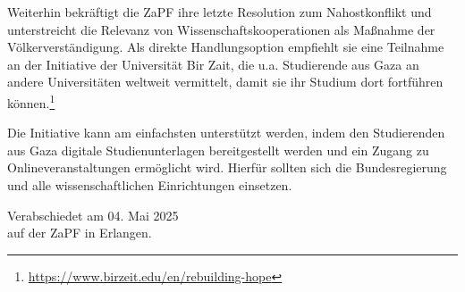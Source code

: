 \documentclass[DIV=calc]{scrartcl}
\begin{document}
Weiterhin bekräftigt die ZaPF ihre letzte Resolution zum Nahostkonflikt und unterstreicht die Relevanz von Wissenschaftskooperationen als Maßnahme der Völkerverständigung. Als direkte Handlungsoption empfiehlt sie eine Teilnahme an der Initiative der Universität Bir Zait, die u.a. Studierende aus Gaza an andere Universitäten weltweit vermittelt, damit sie ihr Studium dort fortführen können.\footnote{\label{note10}\url{https://www.birzeit.edu/en/rebuilding-hope}}

Die Initiative kann am einfachsten unterstützt werden, indem den Studierenden aus Gaza digitale Studienunterlagen bereitgestellt werden und ein Zugang zu Onlineveranstaltungen ermöglicht wird. Hierfür sollten sich die Bundesregierung und
alle wissenschaftlichen Einrichtungen einsetzen.




\vspace{1cm} 
%
\vfill
\begin{flushright}
	Verabschiedet am 04. Mai 2025 \\
	auf der ZaPF in Erlangen.
\end{flushright}
\end{document}
